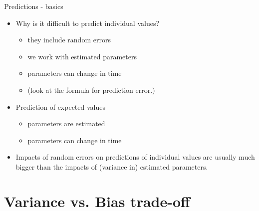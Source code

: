 \documentclass{beamer}
\begin{document}
\begin{frame}{Predictions - basics}
\begin{itemize}
\item Why is it difficult to predict individual values? 
\begin{itemize}
\item they include random errors
\item we work with estimated parameters
\item parameters can change in time
\item (look at the formula for prediction error.)
\end{itemize}
\vspace{0.3cm}
\item Prediction of expected values
\begin{itemize}
\item parameters are estimated
\item parameters can change in time
\end{itemize}
\vspace{0.3cm}
\item Impacts of random errors on predictions of individual values are usually much bigger than the impacts of (variance in) estimated parameters.
\end{itemize}
\end{frame}
\section{Variance vs. Bias trade-off}
\end{document}
